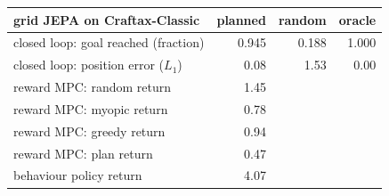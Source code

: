 \begin{tabular}{lrrr}
\toprule
grid JEPA on Craftax-Classic & planned & random & oracle \\
\midrule
closed loop: goal reached (fraction) & 0.945 & 0.188 & 1.000 \\
closed loop: position error ($L_1$) & 0.08 & 1.53 & 0.00 \\
\midrule
reward MPC: random return & 1.45 & & \\
reward MPC: myopic return & 0.78 & & \\
reward MPC: greedy return & 0.94 & & \\
reward MPC: plan return & 0.47 & & \\
behaviour policy return & 4.07 & & \\
\bottomrule
\end{tabular}
